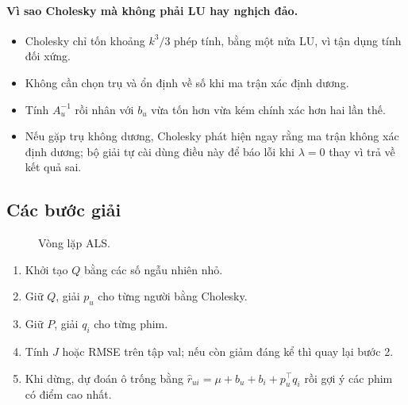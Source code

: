 \paragraph{Vì sao Cholesky mà không phải LU hay nghịch đảo.}
\begin{itemize}
  \item Cholesky chỉ tốn khoảng $k^3/3$ phép tính, bằng một nửa LU, vì tận dụng tính đối xứng.
  \item Không cần chọn trụ và ổn định về số khi ma trận xác định dương.
  \item Tính $A_u^{-1}$ rồi nhân với $b_u$ vừa tốn hơn vừa kém chính xác hơn hai lần thế.
  \item Nếu gặp trụ không dương, Cholesky phát hiện ngay rằng ma trận không xác định dương; bộ giải tự cài
        dùng điều này để báo lỗi khi $\lambda = 0$ thay vì trả về kết quả sai.
\end{itemize}

\subsection{Các bước giải}

\begin{figure}[H]
\centering
{}
\caption{Vòng lặp ALS.}
\label{fig:als-loop}
\end{figure}

\begin{enumerate}
  \item Khởi tạo $Q$ bằng các số ngẫu nhiên nhỏ.
  \item Giữ $Q$, giải $p_u$ cho từng người bằng Cholesky.
  \item Giữ $P$, giải $q_i$ cho từng phim.
  \item Tính $J$ hoặc RMSE trên tập val; nếu còn giảm đáng kể thì quay lại bước 2.
  \item Khi dừng, dự đoán ô trống bằng $\hat r_{ui} = \mu + b_u + b_i + p_u^\top q_i$ rồi gợi ý các phim có
        điểm cao nhất.
\end{enumerate}

